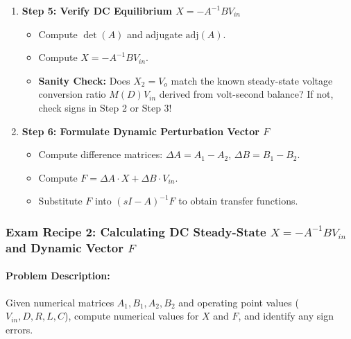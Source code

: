\begin{enumerate}
  \item \textbf{Step 5: Verify DC Equilibrium $X = -A^{-1} B V_{in}$}
  \begin{itemize}
    \item Compute $\det(A)$ and adjugate $\text{adj}(A)$.
    \item Compute $X = -A^{-1} B V_{in}$.
    \item \textbf{Sanity Check:} Does $X_2 = V_o$ match the known steady-state voltage conversion ratio $M(D) V_{in}$ derived from volt-second balance? If not, check signs in Step 2 or Step 3!
  \end{itemize}

  \item \textbf{Step 6: Formulate Dynamic Perturbation Vector $F$}
  \begin{itemize}
    \item Compute difference matrices: $\Delta A = A_1 - A_2$, $\Delta B = B_1 - B_2$.
    \item Compute $F = \Delta A \cdot X + \Delta B \cdot V_{in}$.
    \item Substitute $F$ into $(s I - A)^{-1} F$ to obtain transfer functions.
  \end{itemize}
\end{enumerate}

\subsubsection{Exam Recipe 2: Calculating DC Steady-State $X = -A^{-1} B V_{in}$ and Dynamic Vector $F$}
\paragraph{Problem Description:}
Given numerical matrices $A_1, B_1, A_2, B_2$ and operating point values ($V_{in}, D, R, L, C$), compute numerical values for $X$ and $F$, and identify any sign errors.


